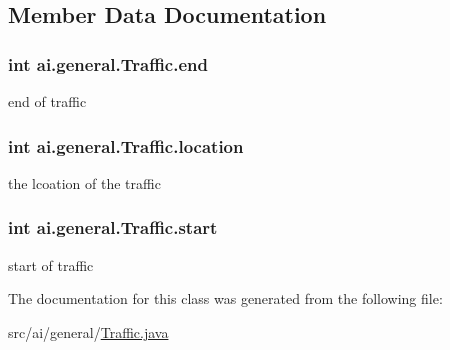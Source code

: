 \subsection{Member Data Documentation}
\hypertarget{classai_1_1general_1_1_traffic_ad70ae05cfd6c796fbc13c9cf9f6ff6a7}{
\subsubsection[{end}]{\setlength{\rightskip}{0pt plus 5cm}int {\bf ai.general.Traffic.end}}}
\label{classai_1_1general_1_1_traffic_ad70ae05cfd6c796fbc13c9cf9f6ff6a7}
end of traffic \hypertarget{classai_1_1general_1_1_traffic_a158af021968f53b9e7ddc9fa53c79a06}{
\subsubsection[{location}]{\setlength{\rightskip}{0pt plus 5cm}int {\bf ai.general.Traffic.location}}}
\label{classai_1_1general_1_1_traffic_a158af021968f53b9e7ddc9fa53c79a06}
the lcoation of the traffic \hypertarget{classai_1_1general_1_1_traffic_a0446adee9e4afb8cfe6118ad30a45732}{
\subsubsection[{start}]{\setlength{\rightskip}{0pt plus 5cm}int {\bf ai.general.Traffic.start}}}
\label{classai_1_1general_1_1_traffic_a0446adee9e4afb8cfe6118ad30a45732}
start of traffic 

The documentation for this class was generated from the following file:\begin{DoxyCompactItemize}
\item 
src/ai/general/\hyperlink{_traffic_8java}{Traffic.java}\end{DoxyCompactItemize}
